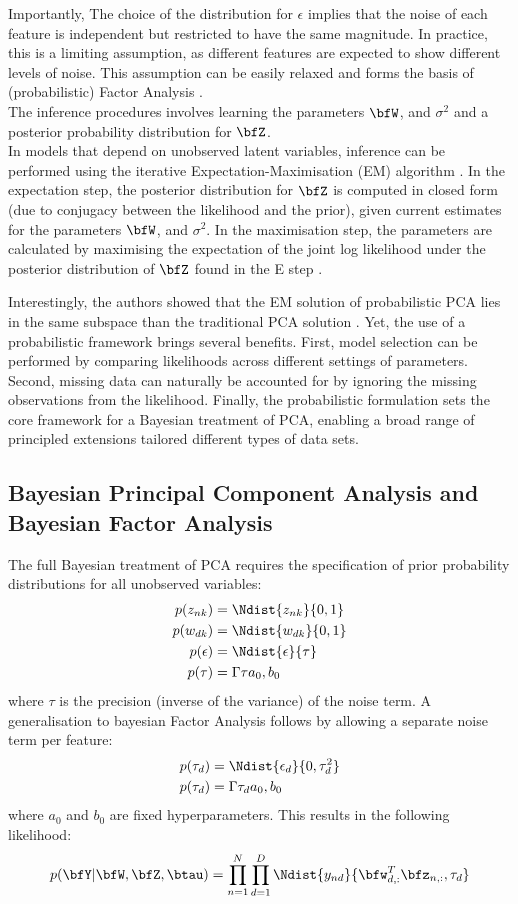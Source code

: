 Importantly, The choice of the distribution for $\epsilon$ implies that the noise of each feature is independent but restricted to have the same magnitude. In practice, this is a limiting assumption, as different features are expected to show different levels of noise. This assumption can be easily relaxed and forms the basis of (probabilistic) Factor Analysis \cite{???}.\\

The inference procedures involves learning the parameters $\bfW$, and $\sigma^2$ and a posterior probability distribution for $\bfZ$.\\
In models that depend on unobserved latent variables, inference can be performed using the iterative Expectation-Maximisation (EM) algorithm \cite{Rubin1983}. In the expectation step, the posterior distribution for $\bfZ$ is computed in closed form (due to conjugacy between the likelihood and the prior), given current estimates for the parameters $\bfW$, and $\sigma^2$. In the maximisation step, the parameters are calculated by maximising the expectation of the joint log likelihood under the posterior distribution of $\bfZ$ found in the E step \cite{TippinBishop}.

Interestingly, the authors showed that the EM solution of probabilistic PCA lies in the same subspace than the traditional PCA solution \cite{ppca}. Yet, the use of a probabilistic framework brings several benefits. First, model selection can be performed by comparing likelihoods across different settings of parameters. Second, missing data can naturally be accounted for by ignoring the missing observations from the likelihood. Finally, the probabilistic formulation sets the core framework for a Bayesian treatment of PCA, enabling a broad range of principled extensions tailored different types of data sets.


\subsection{Bayesian Principal Component Analysis and Bayesian Factor Analysis}

The full Bayesian treatment of PCA requires the specification of prior probability distributions for all unobserved variables:
\begin{align}
	p(z_{nk}) &= \Ndist{z_{nk}}{0,1} \\
	p(w_{dk}) &= \Ndist{w_{dk}}{0,1} \\
	p(\epsilon) &= \Ndist {\epsilon}{\tau} \\
	p(\tau) &= \Gamma{\tau}{a_0,b_0}
\end{align}
where $\tau$ is the precision (inverse of the variance) of the noise term. A generalisation to bayesian Factor Analysis follows by allowing a separate noise term per feature:
\begin{align}
	p(\tau_d) &= \Ndist {\epsilon_d}{0,\tau_d^2} \\
	p(\tau_d) &= \Gamma{\tau_d}{a_0,b_0}
\end{align}
where $a_0$ and $b_0$ are fixed hyperparameters. This results in the following likelihood:
\[
	p(\bfY|\bfW,\bfZ,\btau) = \prod_{n=1}^{N} \prod_{d=1}^{D} \Ndist{y_{nd}}{\bfw_{d,:}^T \bfz_{n,:},\tau_d}
\]


